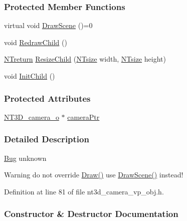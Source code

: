 \subsubsection*{Protected Member Functions}
\begin{DoxyCompactItemize}
\item 
virtual void \hyperlink{class_n_t3_d__camera__vp__o_afa47dc23c6a8e8cbc3ead021bf989948}{DrawScene} ()=0
\item 
void \hyperlink{class_n_t3_d__camera__vp__o_af5a8ae2d1f279394e66c5727c13e4c9c}{RedrawChild} ()
\item 
\hyperlink{nt__types_8h_ab9564ee8f091e809d21b8451c6683c53}{NTreturn} \hyperlink{class_n_t3_d__camera__vp__o_a0f7c80160d0cae26a83491d197cf59ef}{ResizeChild} (\hyperlink{nt__types_8h_a06c124f2e4469769b58230253ce0560b}{NTsize} width, \hyperlink{nt__types_8h_a06c124f2e4469769b58230253ce0560b}{NTsize} height)
\item 
void \hyperlink{class_n_t3_d__camera__vp__o_a10ee3834eb703b5b63051fc2662f85ed}{InitChild} ()
\end{DoxyCompactItemize}
\subsubsection*{Protected Attributes}
\begin{DoxyCompactItemize}
\item 
\hyperlink{class_n_t3_d__camera__o}{NT3D\_\-camera\_\-o} $\ast$ \hyperlink{class_n_t3_d__camera__vp__o_a65b1a65c8c7ed200a010152ab69413db}{cameraPtr}
\end{DoxyCompactItemize}


\subsubsection{Detailed Description}
\begin{Desc}
\item[\hyperlink{bug__bug000010}{Bug}]unknown \end{Desc}
\begin{DoxyWarning}{Warning}
do not override \hyperlink{class_n_t3_d__camera__vp__o_a21cea10d6b586143ecf025cb45888b04}{Draw()} use \hyperlink{class_n_t3_d__camera__vp__o_afa47dc23c6a8e8cbc3ead021bf989948}{DrawScene()} instead! 
\end{DoxyWarning}


Definition at line 81 of file nt3d\_\-camera\_\-vp\_\-obj.h.



\subsubsection{Constructor \& Destructor Documentation}
